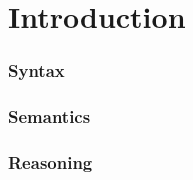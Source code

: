 \part{Introduction}
\section{Syntax}


%

%

% 

\section{Semantics}


% 

% 
% 
% 
% 
% 
% 

% 

%
% 
% 
% 
% 
% 
\section{Reasoning}


